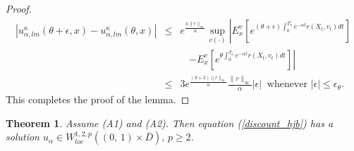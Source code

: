\documentclass[11pt]{amsart}
\newtheorem{theorem}{\bf Theorem}[section]
\numberwithin{equation}{section}
\begin{document}
\begin{proof}
\begin{eqnarray*}
 | u^{\kappa}_{\alpha,lm}(\theta+\epsilon,x)- u^{\kappa}_{\alpha,lm}(\theta,x)| &\leq& 
e^{\frac{\kappa\|r\|_{\infty}}{\alpha}} \sup_{v(\cdot)}\left| E^v_x\left[ e^{ (\theta+\epsilon) \int_{0}^{T^{\epsilon}_{\kappa}}  
e^{-\alpha t} r(X_t, v_t) dt }\right] \right. \\
&& \ \ \ \ \left. - E^v_x\left[ e^{ \theta \int_{0}^{T_{\kappa}}  e^{-\alpha t} r(X_t, v_t) dt }\right] \right| \\
&\leq&  3 e^{\frac{(\theta+3)\|r\|_{\infty}} {\alpha}} \frac{\|r\|_{\infty}}{\alpha} |\epsilon|
   \ \mbox{ whenever } |\epsilon|\leq \epsilon_{\theta}.
\end{eqnarray*}
This completes the proof of the lemma.
\end{proof}

\begin{theorem}\label{Thm_discount_hjb}
 Assume (A1) and (A2). Then equation (\ref{discount_hjb}) has a solution 
 $u_{\alpha} \in  W^{1,2,p}_{loc}((0, \, 1) \times \overline{D} ), \, p \geq 2$.
\end{theorem}
\end{document}
